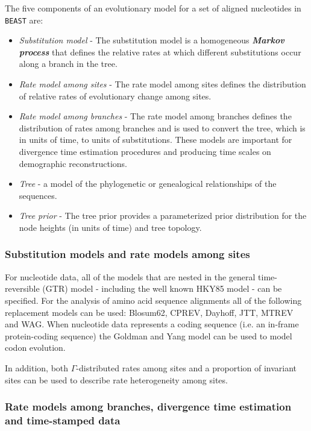 \documentclass[cup7b, english]{cupbook}
\begin{document}
The five components of an evolutionary model for a set of aligned
nucleotides in \texttt{BEAST} are:

\begin{itemize}
\item \emph{Substitution model} - The substitution model is a homogeneous \textbf{\textit{Markov
process}} that defines the relative rates at which different substitutions
occur along a branch in the tree.
\item \emph{Rate model among sites} - The rate model among sites defines the distribution
of relative rates of evolutionary change among sites.
\item \emph{Rate model among branches} - The rate model among branches defines
the distribution of rates among branches and is used to convert the
tree, which is in units of time, to units of substitutions. These
models are important for divergence time estimation procedures and producing time
scales on demographic reconstructions.
\item \emph{Tree} - a model of the phylogenetic or genealogical relationships of
the sequences.
\item \emph{Tree prior} - The tree prior provides a parameterized prior distribution
for the node heights (in units of time) and tree topology.
\end{itemize}

\subsubsection{Substitution models and rate models among sites}

For nucleotide data, all of the models that are nested in the general
time-reversible (GTR) model \cite{ROMM1990} - including the well
known HKY85 model \cite{HKY1985} - can be specified. For the analysis
of amino acid sequence alignments all of the following replacement
models can be used: Blosum62, CPREV, Dayhoff, JTT, MTREV and WAG.
When nucleotide data represents a coding sequence (i.e. an in-frame
protein-coding sequence) the Goldman and Yang model \cite{GY1994} can be used to model
codon evolution.

In addition, both $\Gamma$-distributed rates among sites \cite{Y1994}
and a proportion of invariant sites can be used to describe rate heterogeneity
among sites.

\subsubsection{Rate models among branches, divergence time estimation and time-stamped
data}
\end{document}
